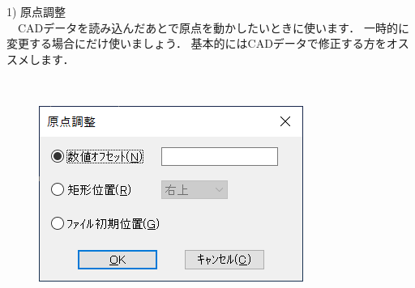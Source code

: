 \begin{minipage}[t]{0.58\textwidth}
1) 原点調整\label{sec:origin}\\
　CADデータを読み込んだあとで原点を動かしたいときに使います．
一時的に変更する場合にだけ使いましょう．
基本的にはCADデータで修正する方をオススメします．
\end{minipage}
\begin{minipage}[t]{0.02\textwidth}
　
\end{minipage}
\begin{minipage}[t]{0.4\textwidth}
\vspace*{-2zh}
\begin{figure}[H]
\centering
\includegraphics[width=\textwidth]{No6/fig/cad-origin.png}
\label{fig:cad-origin.png}
\end{figure}
\end{minipage}

